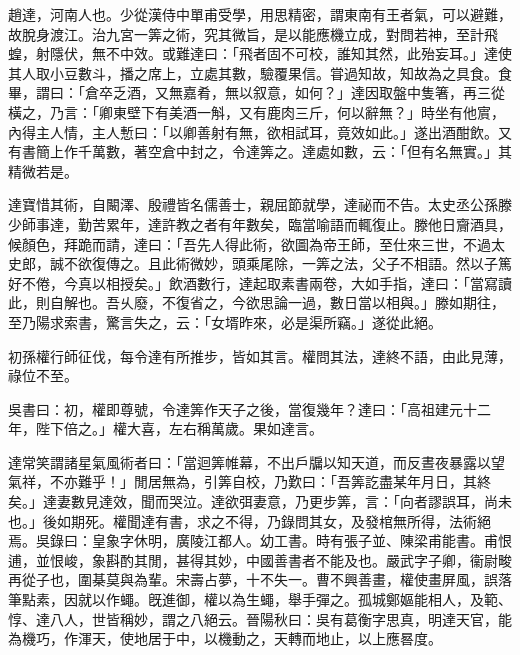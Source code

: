 
\begin{pinyinscope}
趙達，河南人也。少從漢侍中單甫受學，用思精密，謂東南有王者氣，可以避難，故脫身渡江。治九宮一筭之術，究其微旨，是以能應機立成，對問若神，至計飛蝗，射隱伏，無不中效。或難達曰：「飛者固不可校，誰知其然，此殆妄耳。」達使其人取小豆數斗，播之席上，立處其數，驗覆果信。甞過知故，知故為之具食。食畢，謂曰：「倉卒乏酒，又無嘉肴，無以叙意，如何？」達因取盤中隻箸，再三從橫之，乃言：「卿東壁下有美酒一斛，又有鹿肉三斤，何以辭無？」時坐有他賔，內得主人情，主人慙曰：「以卿善射有無，欲相試耳，竟效如此。」遂出酒酣飲。又有書簡上作千萬數，著空倉中封之，令達筭之。達處如數，云：「但有名無實。」其精微若是。

達寶惜其術，自闞澤、殷禮皆名儒善士，親屈節就學，達祕而不告。太史丞公孫滕少師事達，勤苦累年，達許教之者有年數矣，臨當喻語而輒復止。滕他日齎酒具，候顏色，拜跪而請，達曰：「吾先人得此術，欲圖為帝王師，至仕來三世，不過太史郎，誠不欲復傳之。且此術微妙，頭乘尾除，一筭之法，父子不相語。然以子篤好不倦，今真以相授矣。」飲酒數行，達起取素書兩卷，大如手指，達曰：「當寫讀此，則自解也。吾乆廢，不復省之，今欲思論一過，數日當以相與。」滕如期往，至乃陽求索書，驚言失之，云：「女壻昨來，必是渠所竊。」遂從此絕。

初孫權行師征伐，每令達有所推步，皆如其言。權問其法，達終不語，由此見薄，祿位不至。

吳書曰：初，權即尊號，令達筭作天子之後，當復幾年？達曰：「高祖建元十二年，陛下倍之。」權大喜，左右稱萬歲。果如達言。

達常笑謂諸星氣風術者曰：「當迴筭帷幕，不出戶牖以知天道，而反晝夜暴露以望氣祥，不亦難乎！」閒居無為，引筭自校，乃歎曰：「吾筭訖盡某年月日，其終矣。」達妻數見達效，聞而哭泣。達欲弭妻意，乃更步筭，言：「向者謬誤耳，尚未也。」後如期死。權聞達有書，求之不得，乃錄問其女，及發棺無所得，法術絕焉。吳錄曰：皇象字休明，廣陵江都人。幼工書。時有張子並、陳梁甫能書。甫恨逋，並恨峻，象斟酌其閒，甚得其妙，中國善書者不能及也。嚴武字子卿，衞尉畯再從子也，圍棊莫與為輩。宋壽占夢，十不失一。曹不興善畫，權使畫屏風，誤落筆點素，因就以作蠅。旣進御，權以為生蠅，舉手彈之。孤城鄭嫗能相人，及範、惇、達八人，世皆稱妙，謂之八絕云。晉陽秋曰：吳有葛衡字思真，明達天官，能為機巧，作渾天，使地居于中，以機動之，天轉而地止，以上應晷度。


\end{pinyinscope}
